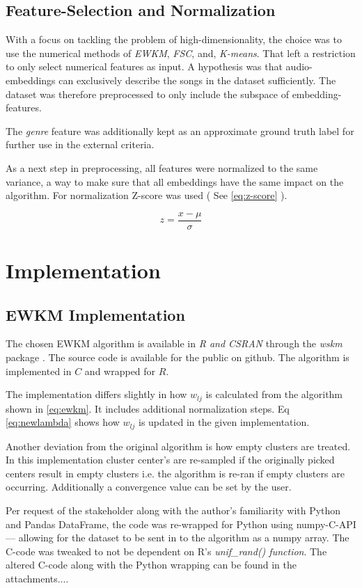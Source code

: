 \documentclass[../report.tex]{subfiles}
\begin{document}
\subsection{Feature-Selection and Normalization}
With a focus on tackling the problem of high-dimensionality, the choice was to use the numerical methods of \textit{EWKM}, \textit{FSC}, and, \textit{K-means}.
That left a restriction to only select numerical features as input. A hypothesis was that audio-embeddings can exclusively describe the songs in the dataset sufficiently. The dataset was therefore preprocessed to only include the subspace of embedding-features.

The \textit{genre} feature was additionally kept as an approximate ground truth label for further use in the external criteria.

As a next step in preprocessing, all features were normalized to the same variance, a way to make sure that all embeddings have the same impact on the algorithm.
For normalization Z-score was used ( See \ref{eq:z-score} ).


\begin{equation}
  \label{eq:z-score}
  z = \frac{x - \mu}{\sigma}
\end{equation}

\section{Implementation}
\subsection{EWKM Implementation}
The chosen EWKM algorithm is available in \textit{R and CSRAN} through the \textit{wskm} package \cite{wskm2014hz}. The source code is available for the public on github. The algorithm is implemented in $C$ and wrapped for $R$.

The implementation differs slightly in how $w_{lj}$ is calculated from the algorithm shown in \ref{eq:ewkm}. It includes additional normalization steps. Eq \ref{eq:newlambda} shows how $w_{lj}$ is updated in the given implementation. 

Another deviation from the original algorithm is how empty clusters are treated. In this implementation cluster center's are re-sampled if the originally picked centers result in empty clusters i.e. the algorithm is re-ran if empty clusters are occurring. Additionally a convergence value can be set by the user.

Per request of the stakeholder along with the author's familiarity with Python and Pandas DataFrame, the code was re-wrapped for Python using numpy-C-API \cite{numpy-c} --- allowing for the dataset to be sent in to the algorithm as a numpy array. The C-code was tweaked to not be dependent on R's \textit{unif\_rand() function}. The altered C-code along with the Python wrapping can be found in the attachments.... 
\end{document}
